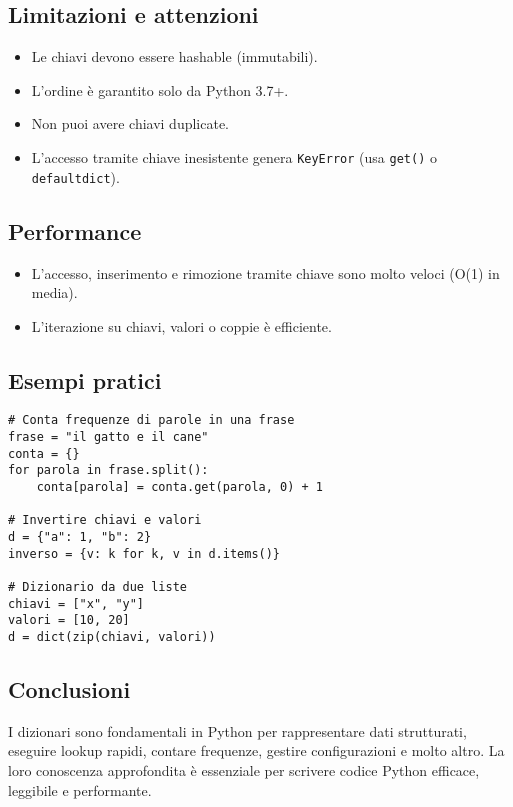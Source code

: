 \documentclass[a4paper,12pt]{article}
\begin{document}
\subsection*{Limitazioni e attenzioni}
\begin{itemize}
    \item Le chiavi devono essere hashable (immutabili).
    \item L'ordine è garantito solo da Python 3.7+.
    \item Non puoi avere chiavi duplicate.
    \item L'accesso tramite chiave inesistente genera \texttt{KeyError} (usa \texttt{get()} o \texttt{defaultdict}).
\end{itemize}

\subsection*{Performance}
\begin{itemize}
    \item L'accesso, inserimento e rimozione tramite chiave sono molto veloci (O(1) in media).
    \item L'iterazione su chiavi, valori o coppie è efficiente.
\end{itemize}

\subsection*{Esempi pratici}
\begin{lstlisting}
# Conta frequenze di parole in una frase
frase = "il gatto e il cane"
conta = {}
for parola in frase.split():
    conta[parola] = conta.get(parola, 0) + 1

# Invertire chiavi e valori
d = {"a": 1, "b": 2}
inverso = {v: k for k, v in d.items()}

# Dizionario da due liste
chiavi = ["x", "y"]
valori = [10, 20]
d = dict(zip(chiavi, valori))
\end{lstlisting}

\subsection*{Conclusioni}
I dizionari sono fondamentali in Python per rappresentare dati strutturati, eseguire lookup rapidi, contare frequenze, gestire configurazioni e molto altro. La loro conoscenza approfondita è essenziale per scrivere codice Python efficace, leggibile e performante.
\end{document}
